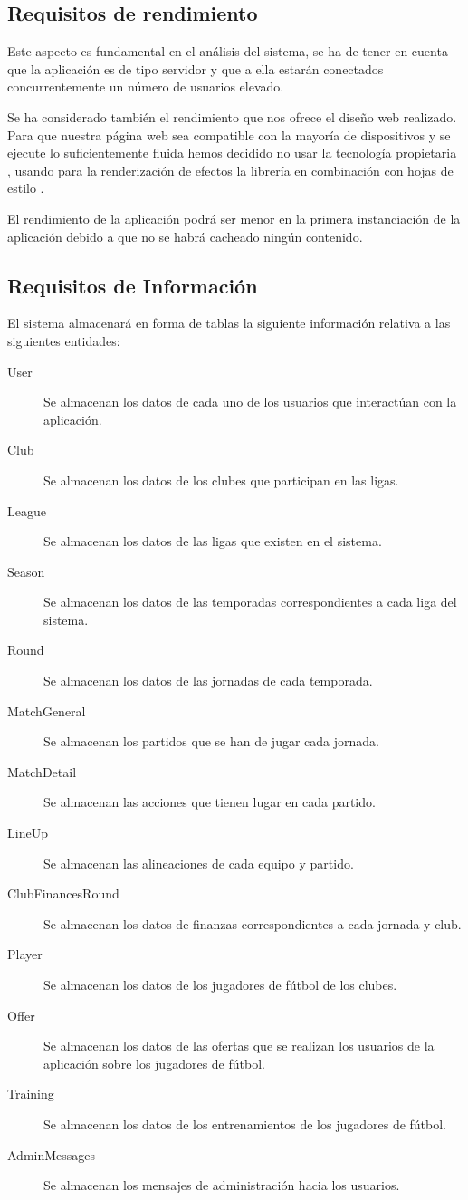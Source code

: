 \subsection{Requisitos de rendimiento}
Este aspecto es fundamental en el análisis del sistema, se ha de tener en cuenta que la aplicación es de
tipo servidor y que a ella estarán conectados concurrentemente un número de
usuarios elevado.

Se ha considerado también el rendimiento que nos ofrece el diseño web realizado. Para que nuestra
página web sea compatible con la mayoría de dispositivos y se ejecute lo suficientemente fluida hemos
decidido no usar la tecnología propietaria , usando para la renderización de efectos la librería
 en combinación con hojas de estilo .

El rendimiento de la aplicación podrá ser menor en la primera instanciación de la aplicación debido a
que no se habrá cacheado ningún contenido.

\subsection{Requisitos de Información}
El sistema almacenará en forma de tablas la siguiente información relativa a las
siguientes entidades:

\begin{description}
\item[User] Se almacenan los datos de cada uno de los usuarios que
  interactúan con la aplicación.
\item[Club] Se almacenan los datos de los clubes que participan en
  las ligas.
\item[League] Se almacenan los datos de las ligas que existen en el
  sistema.
\item[Season] Se almacenan los datos de las temporadas
  correspondientes a cada liga del sistema.
\item[Round] Se almacenan los datos de las jornadas de cada
  temporada.
\item[MatchGeneral] Se almacenan los partidos que se han de jugar
  cada jornada.
\item[MatchDetail] Se almacenan las acciones que tienen lugar en cada
  partido.
\item[LineUp] Se almacenan las alineaciones de cada equipo y partido.
\item[ClubFinancesRound] Se almacenan los datos de finanzas
  correspondientes a cada jornada y club.
\item[Player] Se almacenan los datos de los jugadores de fútbol de
  los clubes.
\item[Offer] Se almacenan los datos de las ofertas que se realizan
  los usuarios de la aplicación sobre los jugadores de fútbol.
\item[Training] Se almacenan los datos de los entrenamientos de los
  jugadores de fútbol.
\item[AdminMessages] Se almacenan los mensajes de administración
  hacia los usuarios.
\end{description}

